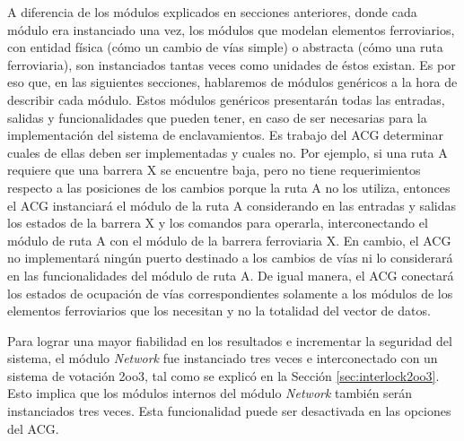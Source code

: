 	A diferencia de los módulos explicados en secciones anteriores, donde cada módulo era instanciado una vez, los módulos que modelan elementos ferroviarios, con entidad física (cómo un cambio de vías simple) o abstracta (cómo una ruta ferroviaria), son instanciados tantas veces como unidades de éstos existan. Es por eso que, en las siguientes secciones, hablaremos de módulos genéricos a la hora de describir cada módulo. Estos módulos genéricos presentarán todas las entradas, salidas y funcionalidades que pueden tener, en caso de ser necesarias para la implementación del sistema de enclavamientos. Es trabajo del ACG determinar cuales de ellas deben ser implementadas y cuales no. Por ejemplo, si una ruta A requiere que una barrera X se encuentre baja, pero no tiene requerimientos respecto a las posiciones de los cambios porque la ruta A no los utiliza, entonces el ACG instanciará el módulo de la ruta A considerando en las entradas y salidas los estados de la barrera X y los comandos para operarla, interconectando el módulo de ruta A con el módulo de la barrera ferroviaria X. En cambio, el ACG no implementará ningún puerto destinado a los cambios de vías ni lo considerará en las funcionalidades del módulo de ruta A. De igual manera, el ACG conectará los estados de ocupación de vías correspondientes solamente a los módulos de los elementos ferroviarios que los necesitan y no la totalidad del vector de datos.
	
	Para lograr una mayor fiabilidad en los resultados e incrementar la seguridad del sistema, el módulo \textit{Network} fue instanciado tres veces e interconectado con un sistema de votación 2oo3, tal como se explicó en la Sección \ref{sec:interlock2oo3}. Esto implica que los módulos internos del módulo \textit{Network} también serán instanciados tres veces. Esta funcionalidad puede ser desactivada en las opciones del ACG.
	
	
	
	
	
	
	
	